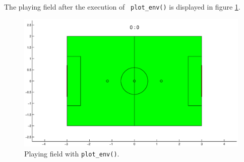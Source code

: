 The playing field after the execution of \texttt{ plot\_env()} is displayed in figure \ref{Playing_field}.

\begin{figure}[h]
	\centering
    	\includegraphics[width=14cm]{./2_Simulation/playing_field}
  	\caption{Playing field with \texttt{plot\_env()}.}
  	\label{Playing_field}
\end{figure}
\pagebreak[4]

